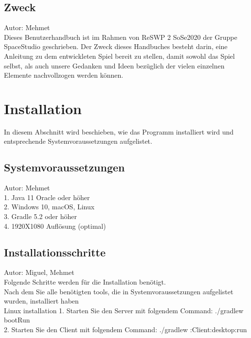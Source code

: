 \documentclass[fontsize=12pt,paper=a4,twoside]{scrartcl}
\begin{document}
\subsection{Zweck}
Autor: Mehmet\\

Dieses Benutzerhandbuch ist im Rahmen von ReSWP 2 SoSe2020  der Gruppe SpaceStudio geschrieben.
Der Zweck dieses Handbuches besteht darin, eine Anleitung zu dem entwickleten Spiel bereit zu stellen, damit sowohl das Spiel selbst, als auch unsere Gedanken und Ideen bezüglich der vielen einzelnen Elemente nachvollzogen werden können.


\section{Installation}
In diesem Abschnitt wird beschieben, wie das Programm installiert wird und entsprechende Systemvoraussetzungen aufgelistet.

\subsection{Systemvoraussetzungen}
Autor: Mehmet\\

1. Java 11 Oracle oder höher \\
2. Windows 10, macOS, Linux \\
3. Gradle 5.2 oder höher \\
4. 1920X1080 Auflösung (optimal)
 

\subsection{Installationsschritte}
Autor: Miguel, Mehmet\\

Folgende  Schritte werden für die Installation benötigt. \\
 Nach dem Sie alle benötigten tools, die in Systemvoraussetzungen aufgelistet wurden, installiert haben \\
Linux installation
1. Starten Sie den Server mit folgendem Command: ./gradlew bootRun\\
2. Starten Sie den Client mit folgendem Command:  ./gradlew :Client:desktop:run \\
\end{document}
